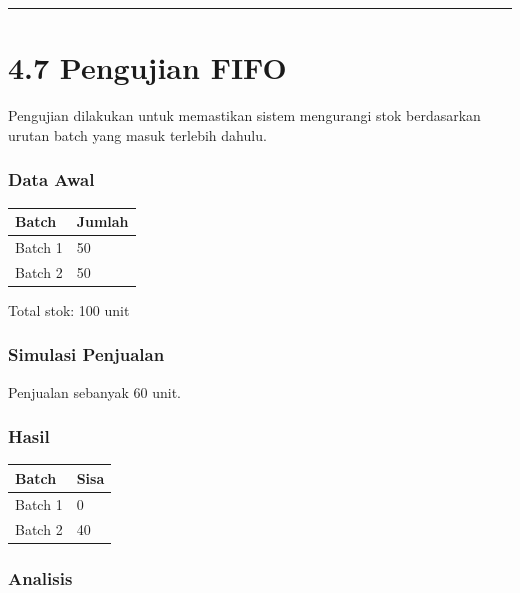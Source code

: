 \begin{center}\rule{0.5\linewidth}{0.5pt}\end{center}

\section{4.7 Pengujian FIFO}\label{pengujian-fifo}

Pengujian dilakukan untuk memastikan sistem mengurangi stok berdasarkan urutan batch yang masuk terlebih dahulu.

\subsubsection{Data Awal}\label{data-awal}

{\def\LTcaptype{none} %
\begin{longtable}[]{@{}ll@{}}
\toprule\noalign{}
Batch & Jumlah \\
\midrule\noalign{}
\endhead
\bottomrule\noalign{}
\endlastfoot
Batch 1 & 50 \\
Batch 2 & 50 \\
\end{longtable}
}

Total stok: 100 unit

\subsubsection{Simulasi Penjualan}\label{simulasi-penjualan}

Penjualan sebanyak 60 unit.

\subsubsection{Hasil}\label{hasil}

{\def\LTcaptype{none} %
\begin{longtable}[]{@{}ll@{}}
\toprule\noalign{}
Batch & Sisa \\
\midrule\noalign{}
\endhead
\bottomrule\noalign{}
\endlastfoot
Batch 1 & 0 \\
Batch 2 & 40 \\
\end{longtable}
}

\subsubsection{Analisis}\label{analisis}

